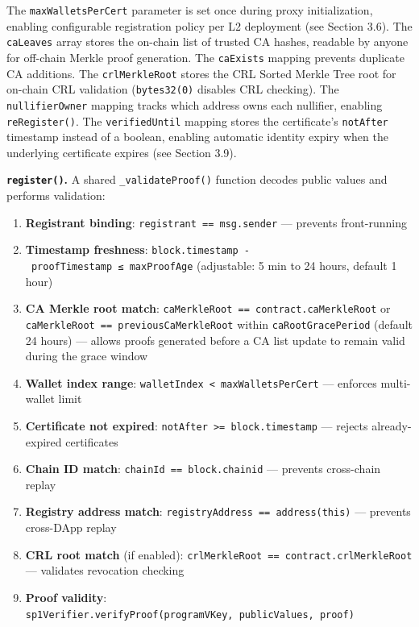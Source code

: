 \documentclass[11pt, a4paper]{article}
\providecommand{\tightlist}{%
  \setlength{\itemsep}{0pt}\setlength{\parskip}{0pt}}
\begin{document}
The \texttt{maxWalletsPerCert} parameter is set once during proxy initialization, enabling
configurable registration policy per L2 deployment (see Section 3.6).
The \texttt{caLeaves} array stores the on-chain list of trusted CA
hashes, readable by anyone for off-chain Merkle proof generation. The
\texttt{caExists} mapping prevents duplicate CA additions. The
\texttt{crlMerkleRoot} stores the CRL Sorted Merkle Tree root for
on-chain CRL validation (\texttt{bytes32(0)} disables CRL checking). The
\texttt{nullifierOwner} mapping tracks which address owns each
nullifier, enabling \texttt{reRegister()}. The \texttt{verifiedUntil}
mapping stores the certificate's \texttt{notAfter} timestamp instead of
a boolean, enabling automatic identity expiry when the underlying
certificate expires (see Section 3.9).

\textbf{\texttt{register()}.} A shared \texttt{\_validateProof()}
function decodes public values and performs validation:

\begin{enumerate}
\def\labelenumi{\arabic{enumi}.}
\tightlist
\item
  \textbf{Registrant binding}: \texttt{registrant\ ==\ msg.sender} ---
  prevents front-running
\item
  \textbf{Timestamp freshness}:
  \texttt{block.timestamp\ -\ proofTimestamp\ ≤\ maxProofAge}
  (adjustable: 5 min to 24 hours, default 1 hour)
\item
  \textbf{CA Merkle root match}:
  \texttt{caMerkleRoot\ ==\ contract.caMerkleRoot} or
  \texttt{caMerkleRoot\ ==\ previousCaMerkleRoot} within
  \texttt{caRootGracePeriod} (default 24 hours) --- allows proofs
  generated before a CA list update to remain valid during the grace
  window
\item
  \textbf{Wallet index range}:
  \texttt{walletIndex\ \textless{}\ maxWalletsPerCert} --- enforces
  multi-wallet limit
\item
  \textbf{Certificate not expired}:
  \texttt{notAfter\ \textgreater{}=\ block.timestamp} --- rejects
  already-expired certificates
\item
  \textbf{Chain ID match}: \texttt{chainId\ ==\ block.chainid} ---
  prevents cross-chain replay
\item
  \textbf{Registry address match}:
  \texttt{registryAddress\ ==\ address(this)} --- prevents cross-DApp
  replay
\item
  \textbf{CRL root match} (if enabled):
  \texttt{crlMerkleRoot\ ==\ contract.crlMerkleRoot} --- validates
  revocation checking
\item
  \textbf{Proof validity}:
  \texttt{sp1Verifier.verifyProof(programVKey,\ publicValues,\ proof)}
\end{enumerate}
\end{document}
